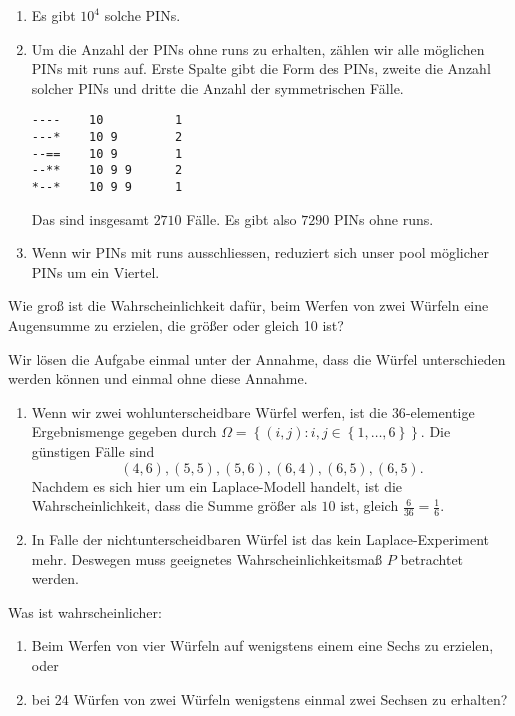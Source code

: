 \solution
\begin{enumerate}
    \item Es gibt $10^4$ solche PINs.
    \item Um die Anzahl der PINs ohne runs zu erhalten, zählen wir alle
        möglichen PINs mit runs auf. Erste Spalte gibt die Form des PINs,
        zweite die Anzahl solcher PINs und dritte die Anzahl der symmetrischen
        Fälle.
\begin{lstlisting}
----    10          1
---*    10 9        2
--==    10 9        1
--**    10 9 9      2
*--*    10 9 9      1
\end{lstlisting}
        Das sind insgesamt $2710$ Fälle. Es gibt also $7290$ PINs ohne runs.
    \item Wenn wir PINs mit runs ausschliessen, reduziert sich unser pool
        möglicher PINs um ein Viertel. 
\end{enumerate}


Wie groß ist die Wahrscheinlichkeit dafür, beim Werfen von zwei Würfeln eine
Augensumme zu erzielen, die größer oder gleich 10 ist?

\solution Wir lösen die Aufgabe einmal unter der Annahme, dass die Würfel
unterschieden werden können und einmal ohne diese Annahme. 
\begin{enumerate}
    \item Wenn wir zwei wohlunterscheidbare Würfel werfen, ist die
        $36$-elementige Ergebnismenge gegeben durch $\Omega = \left\{ (i,j) :
        i,j \in \left\{ 1, \dots, 6 \right\} \right\}$. Die günstigen Fälle
        sind 
        \begin{equation}
            (4,6), (5,5), (5,6), (6,4), (6,5), (6,5).
        \end{equation}
        Nachdem es sich hier um ein Laplace-Modell handelt, ist die
        Wahrscheinlichkeit, dass die Summe größer als $10$ ist, gleich
        $\frac{6}{36}= \frac{1}{6}$.

    \item In Falle der nichtunterscheidbaren Würfel ist das kein
        Laplace-Experiment mehr. Deswegen muss geeignetes
        Wahrscheinlichkeitsmaß $P$ betrachtet werden. 
\end{enumerate}


Was ist wahrscheinlicher:
\begin{enumerate}
    \item Beim Werfen von vier Würfeln auf wenigstens einem eine Sechs zu
        erzielen, oder
    \item bei 24 Würfen von zwei Würfeln wenigstens einmal zwei Sechsen zu
        erhalten?
\end{enumerate}

